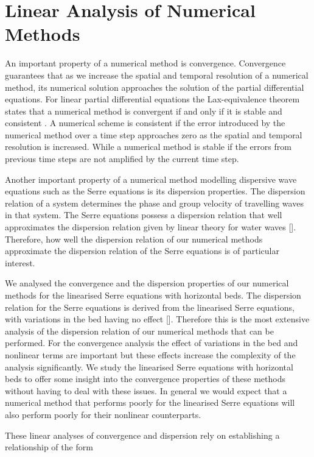 \chapter{Linear Analysis of Numerical Methods}
\label{chp:AnalNumMethod}
An important property of a numerical method is convergence. Convergence guarantees that as we increase the spatial and temporal resolution of a numerical method, its numerical solution approaches the solution of the partial differential equations. For linear partial differential equations the Lax-equivalence theorem states that a numerical method is convergent if and only if it is stable and consistent \cite{Lax-Richtmyer-1956-267}. A numerical scheme is consistent if the error introduced by the numerical method over a time step approaches zero as the spatial and temporal resolution is increased. While a numerical method is stable if the errors from previous time steps are not amplified by the current time step.

Another important property of a numerical method modelling dispersive wave equations such as the Serre equations is its dispersion properties. The dispersion relation of a system determines the phase and group velocity of travelling waves in that system. The Serre equations possess a dispersion relation that well approximates the dispersion relation given by linear theory for water waves []. Therefore, how well the dispersion relation of our numerical methods approximate the dispersion relation of the Serre equations is of particular interest.

We analysed the convergence and the dispersion properties of our numerical methods for the linearised Serre equations with horizontal beds. The dispersion relation for the Serre equations is derived from the linearised Serre equations, with variations in the bed having no effect []. Therefore this is the most extensive analysis of the dispersion relation of our numerical methods that can be performed. For the convergence analysis the effect of variations in the bed and nonlinear terms are important but these effects increase the complexity of the analysis significantly. We study the linearised Serre equations with horizontal beds to offer some insight into the convergence properties of these methods without having to deal with these issues. In general we would expect that a numerical method that performs poorly for the linearised Serre equations will also perform poorly for their nonlinear counterparts.

These linear analyses of convergence and dispersion rely on establishing a relationship of the form

